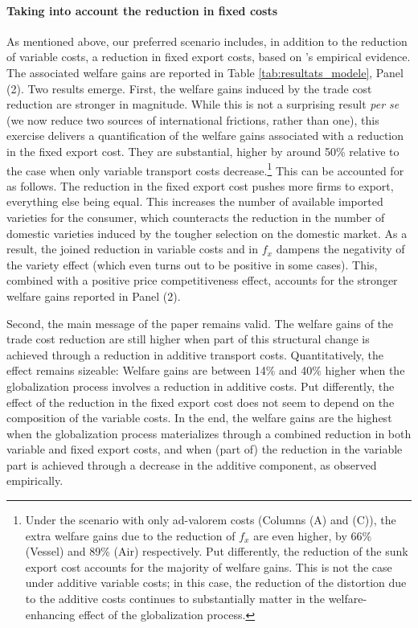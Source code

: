 \documentclass[a4paper,11pt]{article}
\begin{document}
\paragraph{Taking into account the reduction in fixed costs} As mentioned above, our preferred scenario includes, in addition to the reduction of variable costs, a reduction in fixed export costs, based on \cite{Lincoln_McCallum2018}'s empirical evidence.
The associated welfare gains are reported in Table \ref{tab:resultats_modele}, Panel (2).
Two results emerge.
First, the welfare gains induced by the trade cost reduction are stronger in magnitude.
While this is not a surprising result \textit{per se} (we now reduce two sources of international frictions, rather than one), this exercise delivers a quantification of the welfare gains associated with a reduction in the fixed export cost. They are substantial, higher by around 50\% relative to the case when only variable transport costs decrease.\footnote{Under the scenario with only ad-valorem costs (Columns (A) and (C)), the extra welfare gains due to the reduction of $f_x$ are even higher, by 66\% (Vessel) and 89\% (Air) respectively. Put differently, the reduction of the sunk export cost accounts for the majority of welfare gains. This is not the case under additive variable costs; in this case, the reduction of the distortion due to the additive costs continues to substantially matter in the welfare-enhancing effect of the globalization process.}  This can be accounted for as follows. The reduction in the fixed export cost pushes more firms to export, everything else being equal. This increases the number of available imported varieties for the consumer, which counteracts the reduction in the number of domestic varieties induced by the tougher selection on the domestic market. As a result, the joined reduction in variable costs and in $f_x$ dampens the negativity of the variety effect (which even turns out to be positive in some cases). This, combined with a positive price competitiveness effect, accounts for the stronger welfare gains reported in Panel (2).

Second, the main message of the paper remains valid. The welfare gains of the trade cost reduction are still higher when part of this structural change is achieved through a reduction in additive transport costs. Quantitatively, the effect remains sizeable: Welfare gains are between 14\% and 40\% higher when the globalization process involves a reduction in additive costs. Put differently, the effect of the reduction in the fixed export cost does not seem to depend on the composition of the variable costs. In the end, the welfare gains are the highest when the globalization process materializes through a combined reduction in both variable and fixed export costs, and when (part of) the reduction in the variable part is achieved through a decrease in the additive component, as observed empirically.\smallskip
\end{document}
